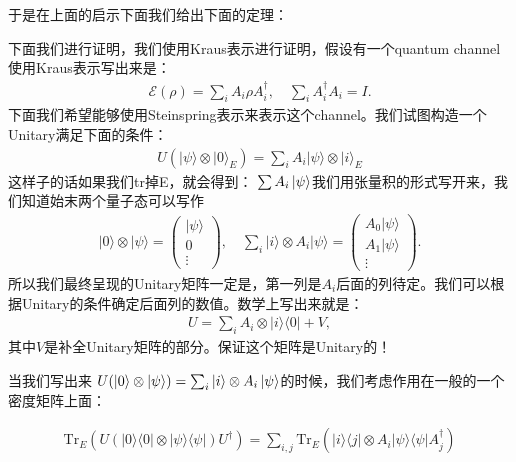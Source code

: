 于是在上面的启示下面我们给出下面的定理：

下面我们进行证明，我们使用Kraus表示进行证明，假设有一个quantum channel 使用Kraus表示写出来是：
\begin{align}
  \mathcal{E}(\rho)=\sum_iA_i\rho A_i^\dagger,\quad\sum_iA_i^\dagger A_i=I. 
\end{align}
下面我们希望能够使用Steinspring表示来表示这个channel。我们试图构造一个Unitary满足下面的条件：
\begin{align}
  U(|\psi\rangle\otimes|0\rangle_E)=\sum_i   A_i |\psi\rangle \otimes |i\rangle_E
\end{align}
这样子的话如果我们tr掉E，就会得到： $ \sum A_i \left| \psi \right\rangle $我们用张量积的形式写开来，我们知道始末两个量子态可以写作
\begin{align}
  |0\rangle\otimes|\psi\rangle=\begin{pmatrix}|\psi\rangle\\0\\\vdots\end{pmatrix},\quad\sum_i\lvert i\rangle\otimes A_i\lvert\psi\rangle=\begin{pmatrix}A_0\lvert\psi\rangle\\A_1\lvert\psi\rangle\\\vdots\end{pmatrix}.
\end{align}
所以我们最终呈现的Unitary矩阵一定是，第一列是$ A_i $后面的列待定。我们可以根据Unitary的条件确定后面列的数值。数学上写出来就是：
\begin{align}
  U = \sum_i A_i \otimes |i\rangle\langle0| + V,
\end{align}
其中$ V $是补全Unitary矩阵的部分。保证这个矩阵是Unitary的！

当我们写出来 $ U(\left| 0 \right\rangle \otimes \left| \psi \right\rangle) = \sum_i \left| i \right\rangle \otimes A_i \left| \psi \right\rangle $的时候，我们考虑作用在一般的一个密度矩阵上面：

\begin{align}
  \mathrm{Tr}_E\left(U(|0\rangle\langle0|\otimes|\psi\rangle\langle\psi|)U^\dagger\right)=\sum_{i,j}\mathrm{Tr}_E\left(|i\rangle\langle j|\otimes A_i|\psi\rangle\langle\psi|A_j^\dagger\right)
\end{align}


